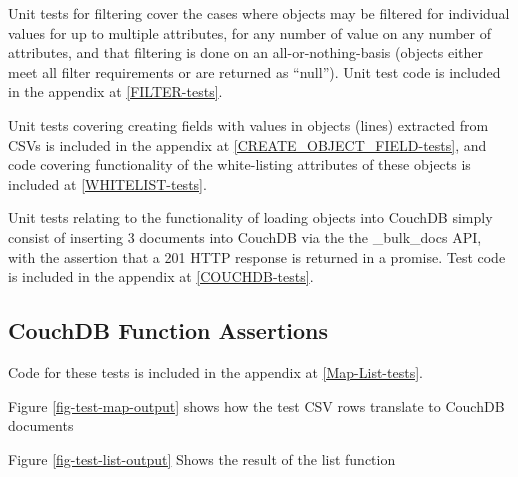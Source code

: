 Unit tests for filtering cover the cases where objects may be filtered for individual values for up to multiple attributes, for any number of value on any number of attributes, and that filtering is done on an all-or-nothing-basis (objects either meet all filter requirements or are returned as ``null''). Unit test code is included in the appendix at \ref{FILTER-tests}.

Unit tests covering creating fields with values in objects (lines) extracted from CSVs is included in the appendix at \ref{CREATE_OBJECT_FIELD-tests}, and code covering functionality of the white-listing attributes of these objects is included at \ref{WHITELIST-tests}.

Unit tests relating to the functionality of loading objects into CouchDB simply consist of inserting 3 documents into CouchDB via the the \_bulk\_docs API, with the assertion that a 201 HTTP response is returned in a promise. Test code is included in the appendix at \ref{COUCHDB-tests}.

\subsection{CouchDB Function Assertions}
Code for these tests is included in the appendix at \ref{Map-List-tests}.

Figure \ref{fig-test-map-output} shows how the test CSV rows translate to CouchDB documents

Figure \ref{fig-test-list-output} Shows the result of the list function